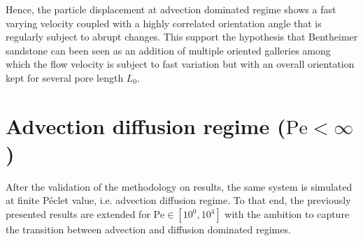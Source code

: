 Hence, the particle displacement at advection dominated regime shows a fast varying velocity coupled with a highly correlated orientation angle that is regularly subject to abrupt changes.
This support the hypothesis that Bentheimer sandstone can been seen as an addition of multiple oriented galleries among which the flow velocity is subject to fast variation but with an overall orientation kept for several pore length $L_0$.

\chapter{Advection diffusion regime ($\mathrm{Pe}<\infty$)}

After the validation of the methodology on \citet{Meyer2016} results, the same system is simulated at finite Péclet value, i.e. advection diffusion regime. 
To that end, the previously presented results are extended for $\mathrm{Pe}\in[10^{0
},10^{4}]$ with the ambition to capture the transition between advection and diffusion dominated regimes.


